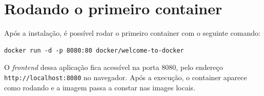 \section{Rodando o primeiro container}

Após a instalação, é possível rodar o primeiro container com o seguinte comando:

\begin{verbatim}
docker run -d -p 8080:80 docker/welcome-to-docker
\end{verbatim}

O \textit{frontend} dessa aplicação fica acessível na porta 8080, pelo endereço \texttt{http://localhost:8080} no navegador. Após a execução, o container aparece como rodando e a imagem passa a constar nas images locais.

